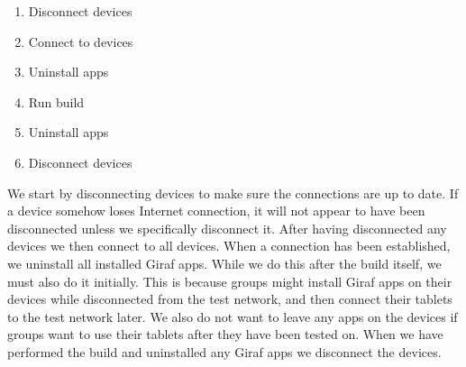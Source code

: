 \begin{enumerate}
  \item Disconnect devices
  \item Connect to devices
  \item Uninstall apps
  \item Run build
  \item Uninstall apps
  \item Disconnect devices
\end{enumerate}

We start by disconnecting devices to make sure the connections are up to date. If a device somehow loses Internet connection, it will not appear to have been disconnected unless we specifically disconnect it. After having disconnected any devices we then connect to all devices. When a connection has been established, we uninstall all installed Giraf apps. While we do this after the build itself, we must also do it initially. This is because groups might install Giraf apps on their devices while disconnected from the test network, and then connect their tablets to the test network later. We also do not want to leave any apps on the devices if groups want to use their tablets after they have been tested on. When we have performed the build and uninstalled any Giraf apps we disconnect the devices.
